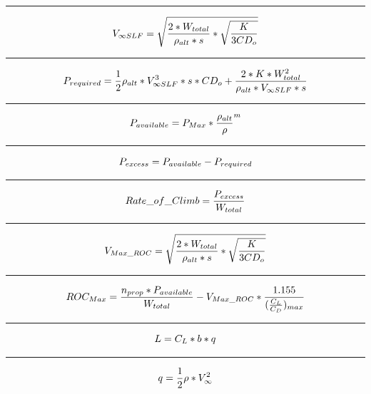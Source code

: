 \documentclass[12pt,A4paper]{article}
\begin{document}
	\hrule
	\vspace{0.1 in}
	\begin{equation}
		V_{\infty SLF} = \sqrt{\frac{2*W_{total}}{\rho_{alt} * s} * \sqrt{\frac{K}{3CD_o}}}\\
	\end{equation}
	\hrule
	\vspace{0.1 in}
	\begin{equation}
		P_{required} = \frac{1}{2} \rho_{alt} * V_{\infty SLF}^3 * s * CD_o + \frac{2 * K * W_{total}^2}{\rho_{alt}*V_{\infty SLF}*s} \\
	\end{equation}
	\hrule
	\vspace{0.1 in}
	\begin{equation}
		P_{available} = P_{Max} * {\frac{\rho_{alt}}{\rho}}^m \\
	\end{equation}
	\hrule
	\vspace{0.1 in}
	\begin{equation}
		P_{excess} = P_{available} - P_{required} \\
	\end{equation}
	\hrule
	\vspace{0.1 in}
	\begin{equation}
		Rate\_of\_Climb = \frac{P_{excess}}{W_{total}} \\
	\end{equation}
	\hrule
	\vspace{0.1 in}
	\begin{equation}
		V_{Max\_ROC} = \sqrt{{\frac{2*W_{total}}{\rho_{alt}*s}} * \sqrt{\frac{K}{3CD_o}}} \\
	\end{equation}
	\hrule
	\vspace{0.1 in}
	\begin{equation}
		ROC_{Max} = \frac{n_{prop}*P_{available}}{W_{total}} - V_{Max\_ROC} * \frac{1.155}{(\frac{C_L}{C_D})_{max}} \\
	\end{equation}
	\hrule
	\vspace{0.1 in}
	\begin{equation}
		L = C_L * b * q \\
	\end{equation}
	\hrule
	\vspace{0.1 in}
	\begin{equation}
		q = \frac{1}{2} \rho * V_\infty^2 \\
	\end{equation}
\end{document}
